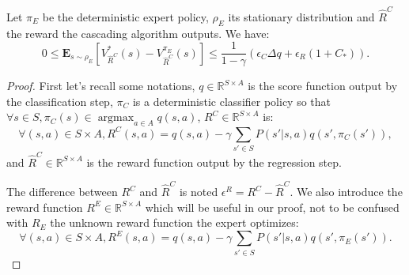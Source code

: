 \documentclass[smallextended]{svjour3}
\newcommand{\E}{\mathbf{E}}
\newcommand{\argmax}{\operatorname*{argmax}} %
\begin{document}
\begin{theorem}
\label{thm}
Let $\pi_E$ be the deterministic expert policy, $\rho_E$ its stationary distribution and $\hat{R}^C$ the reward the cascading algorithm outputs. We have:
\begin{equation}
0\leq\E_{s\sim\rho_E}[V^*_{\hat{R}^C}(s)-V^{\pi_E}_{\hat{R}^C}(s)]\leq \frac{1}{1-\gamma}\left(\epsilon_C\Delta q +\epsilon_R(1+C_*)\right).
\end{equation}
\end{theorem}
\begin{proof}
First let's recall some notations, $q\in\mathbb{R}^{S\times A}$ is the score function output by the classification step, $\pi_C$ is a deterministic classifier policy so that $\forall s \in S,\pi_C(s)\in\argmax_{a\in A}q(s,a)$, $R^C\in\mathbb{R}^{S\times A}$ is:
\begin{equation}
\forall (s,a)\in S\times A, R^C(s,a)=q(s,a) -\gamma\sum_{s'\in S}P(s'|s,a)q(s',\pi_C(s')),
\end{equation}
and $\hat{R}^C\in\mathbb{R}^{S\times A}$ is the reward function output by the regression step.

The difference between $R^C$ and $\hat{R}^C$ is noted $\epsilon^R=R^C-\hat{R}^C$.
We also introduce the reward function $R^E\in\mathbb{R}^{S\times A}$ which will be useful in our proof, not to be confused with $R_E$ the unknown reward function the expert optimizes:
\begin{equation}
\forall (s,a)\in S\times A, R^E(s,a)=q(s,a) -\gamma\sum_{s'\in S}P(s'|s,a)q(s',\pi_E(s')).
\end{equation}


\end{proof}
\end{document}
